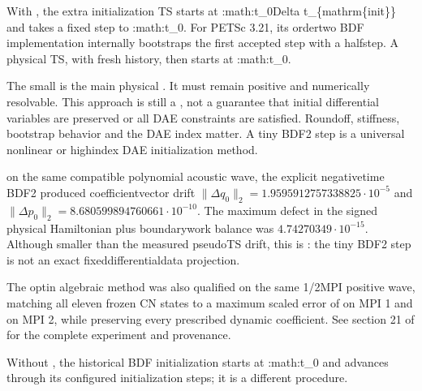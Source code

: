 \documentclass[letterpaper,10pt,english]{sphinxmanual}
\begin{document}
\sphinxAtStartPar
With , the extra
initialization TS starts at :math:\textasciigrave{}t\_0\sphinxhyphen{}Delta t\_\{mathrm\{init\}\}\textasciigrave{}
and takes a fixed step to :math:\textasciigrave{}t\_0\textasciigrave{}.
For PETSc 3.21, its order\sphinxhyphen{}two BDF implementation
internally bootstraps the first accepted step
with a half\sphinxhyphen{}step. A  physical TS, with
fresh history, then starts at :math:\textasciigrave{}t\_0\textasciigrave{}.

\sphinxAtStartPar
The small  is  the main
physical . It must remain positive and
numerically resolvable. This approach is still
a , not a guarantee that
initial differential variables are preserved
or all DAE constraints are satisfied.
Roundoff, stiffness, bootstrap behavior and
the DAE index matter. A tiny BDF2 step is 
a universal nonlinear or high\sphinxhyphen{}index DAE
initialization method.

\sphinxAtStartPar
{} on the
same compatible polynomial acoustic wave, the
explicit negative\sphinxhyphen{}time BDF2 
produced coefficient\sphinxhyphen{}vector drift
\(\|\Delta q_0\|_2=1.9595912757338825\cdot10^{-5}\)
and
\(\|\Delta p_0\|_2=8.680599894760661\cdot10^{-10}\).
The maximum defect in the signed physical
Hamiltonian plus boundary\sphinxhyphen{}work balance
was \(4.74270349\cdot10^{-15}\).
Although smaller than the measured pseudo\sphinxhyphen{}TS
drift, this is : the tiny BDF2 step
is not an exact fixed\sphinxhyphen{}differential\sphinxhyphen{}data projection.

\sphinxAtStartPar
The opt\sphinxhyphen{}in  algebraic method
was also qualified on the same 1/2\sphinxhyphen{}MPI positive
wave, matching all eleven frozen CN states
to a maximum scaled error of  on MPI 1
and  on MPI 2, while
preserving every prescribed dynamic coefficient.
See section 21 of
for the complete experiment and provenance.

\sphinxAtStartPar
Without ,
the historical BDF initialization starts at
:math:\textasciigrave{}t\_0\textasciigrave{} and advances through its configured
initialization steps; it is a different procedure.
\end{document}
